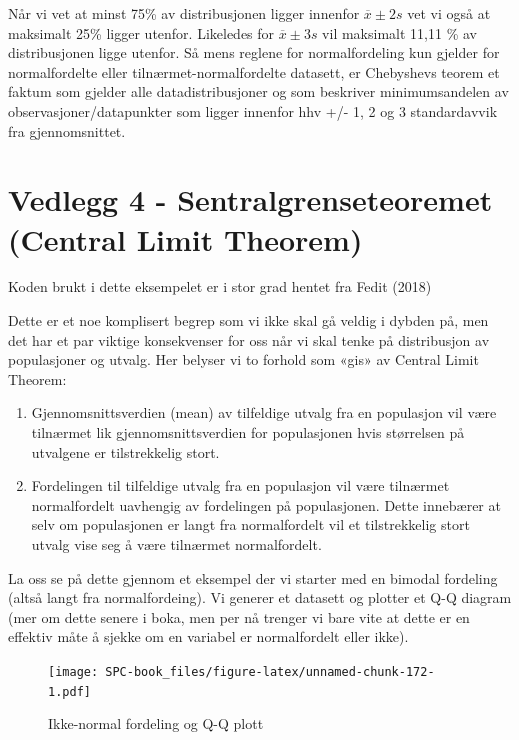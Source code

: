 \documentclass[
]{book}
\providecommand{\tightlist}{%
  \setlength{\itemsep}{0pt}\setlength{\parskip}{0pt}}
\begin{document}
Når vi vet at minst 75\% av distribusjonen ligger innenfor \(\overline{x}\pm2s\) vet vi også at maksimalt 25\% ligger utenfor. Likeledes for \(\overline{x}\pm3s\) vil maksimalt 11,11 \% av distribusjonen ligge utenfor. Så mens reglene for normalfordeling kun gjelder for normalfordelte eller tilnærmet-normalfordelte datasett, er Chebyshevs teorem et faktum som gjelder alle datadistribusjoner og som beskriver minimumsandelen av observasjoner/datapunkter som ligger innenfor hhv +/- 1, 2 og 3 standardavvik fra gjennomsnittet.

\hypertarget{vedlegg-4---sentralgrenseteoremet-central-limit-theorem}{%
\chapter*{Vedlegg 4 - Sentralgrenseteoremet (Central Limit Theorem)}\label{vedlegg-4---sentralgrenseteoremet-central-limit-theorem}}

Koden brukt i dette eksempelet er i stor grad hentet fra Fedit (2018)

Dette er et noe komplisert begrep som vi ikke skal gå veldig i dybden på, men det har et par viktige konsekvenser for oss når vi skal tenke på distribusjon av populasjoner og utvalg. Her belyser vi to forhold som «gis» av Central Limit Theorem:

\begin{enumerate}
\def\labelenumi{\arabic{enumi}.}
\tightlist
\item
  Gjennomsnittsverdien (mean) av tilfeldige utvalg fra en populasjon vil være tilnærmet lik gjennomsnittsverdien for populasjonen hvis størrelsen på utvalgene er tilstrekkelig stort.
\item
  Fordelingen til tilfeldige utvalg fra en populasjon vil være tilnærmet normalfordelt uavhengig av fordelingen på populasjonen. Dette innebærer at selv om populasjonen er langt fra normalfordelt vil et tilstrekkelig stort utvalg vise seg å være tilnærmet normalfordelt.
\end{enumerate}

La oss se på dette gjennom et eksempel der vi starter med en bimodal fordeling (altså langt fra normalfordeing). Vi generer et datasett og plotter et Q-Q diagram (mer om dette senere i boka, men per nå trenger vi bare vite at dette er en effektiv måte å sjekke om en variabel er normalfordelt eller ikke).

\begin{figure}
\centering
\texttt{[image: SPC-book\_files/figure-latex/unnamed-chunk-172-1.pdf]}
\caption{\label{fig:unnamed-chunk-172}Ikke-normal fordeling og Q-Q plott}
\end{figure}
\end{document}
